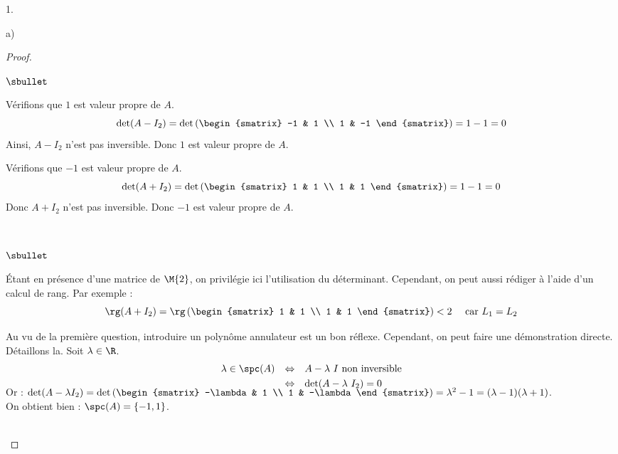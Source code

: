 \documentclass[11pt]{article}%
\begin{document}
\begin{noliste}{1.}
\begin{noliste}{a)}
\begin{proof}
\begin{noliste}{$\sbullet$}
      \item Vérifions que $1$ est valeur propre de $A$.
	\[
	\det (A-I_2) = \det
        \left(
        \begin{smatrix}
          -1 & 1 \\
          1 & -1
	\end{smatrix}
        \right) = 1 - 1 = 0
	\]
	Ainsi, $A-I_2$ n'est pas inversible. Donc $1$ est valeur
        propre de $A$.
      \item Vérifions que $-1$ est valeur propre de $A$.
	\[
	\det (A+I_2) = \det \left(
          \begin{smatrix} 
            1 & 1 \\
            1 & 1
          \end{smatrix} \right) = 1 - 1 = 0
	\]
        Donc $A+I_2$ n'est pas inversible. Donc $-1$ est valeur propre
        de $A$.
      \end{noliste}
      ~\\[-1.4cm]      
      \begin{remark}%
        \begin{noliste}{$\sbullet$}
        \item Étant en présence d'une matrice de $\M{2}$, on privilégie
          ici l'utilisation du déterminant. Cependant, on peut aussi
          rédiger à l'aide d'un calcul de rang. Par exemple :
          \[
          \rg (A+I_2) = \rg \left(
            \begin{smatrix} 
              1 & 1 \\
              1 & 1
            \end{smatrix} \right) < 2 \quad \text{ car $L_1 = L_2$}
          \]
        \item Au vu de la première question, introduire un polynôme
          annulateur est un bon réflexe. Cependant, on peut faire une
          démonstration directe.\\
          Détaillons la. Soit $\lambda \in \R$.
          \[
          \begin{array}{rcl}
            \lambda \in \spc(A) & \Leftrightarrow & \text{$A-\lambda \ I$
              non inversible}
            \\[.1cm]
            & \Leftrightarrow & \det(A - \lambda \ I_2) = 0
            \\[-.4cm]
          \end{array}
          \]
          Or : $\det(A-\lambda I_2) = \det \left(
            \begin{smatrix}
              -\lambda & 1 \\
              1 & -\lambda
            \end{smatrix}
          \right) = \lambda^2-1 = (\lambda-1)(\lambda+1)$.\\          
          On obtient bien : $\spc(A) = \{-1,1\}$.
        \end{noliste}
      \end{remark}~\\[-1.4cm]
    \end{proof}
	


\end{noliste}
\end{noliste}
\end{document}
